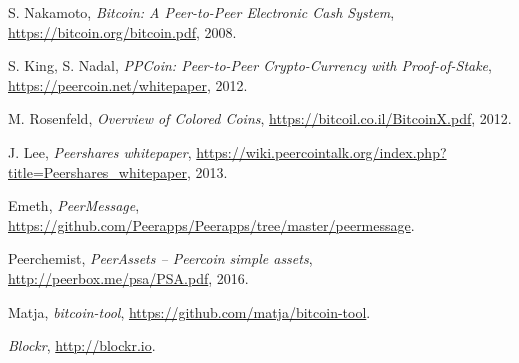 \documentclass[a4paper,10pt]{article}
\begin{document}
\begin{thebibliography}{9}

  S. Nakamoto,
  \emph{Bitcoin: A Peer-to-Peer Electronic Cash System},
  \url{https://bitcoin.org/bitcoin.pdf},
  2008.

  S. King, S. Nadal,
  \emph{PPCoin: Peer-to-Peer Crypto-Currency with Proof-of-Stake},
  \url{https://peercoin.net/whitepaper},
  2012.

  M. Rosenfeld,
  \emph{Overview of Colored Coins},
  \url{https://bitcoil.co.il/BitcoinX.pdf},
  2012.

  J. Lee,
  \emph{Peershares whitepaper},
  \url{https://wiki.peercointalk.org/index.php?title=Peershares_whitepaper},
  2013.

  Emeth,
  \emph{PeerMessage},
  \url{https://github.com/Peerapps/Peerapps/tree/master/peermessage}.

  Peerchemist,
  \emph{PeerAssets – Peercoin simple assets},
  \url{http://peerbox.me/psa/PSA.pdf},
  2016.

  Matja,
  \emph{bitcoin-tool},
  \url{https://github.com/matja/bitcoin-tool}.

  \emph{Blockr},
  \url{http://blockr.io}.

\end{thebibliography}
\end{document}
